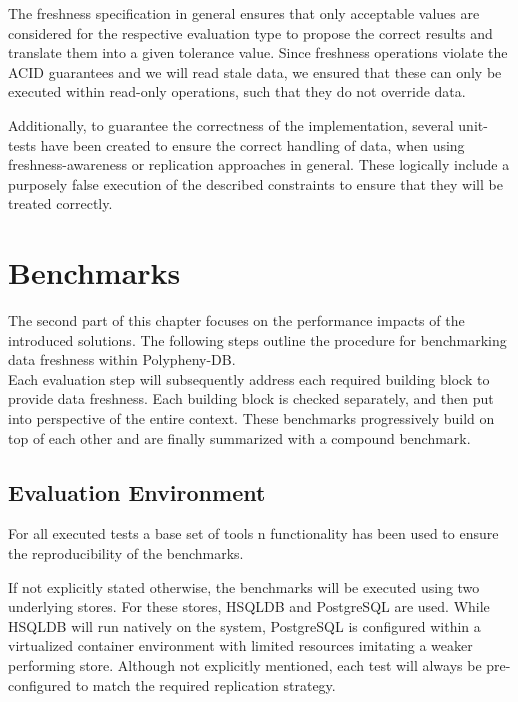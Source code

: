 The freshness specification in general ensures that only acceptable values are considered for the respective evaluation type to propose the correct results and translate them into
a given tolerance value.
Since freshness operations violate the ACID guarantees and we will read stale data, we ensured that these can only be executed within read-only operations, 
such that they do not override data.


Additionally, to guarantee the correctness of the implementation, several unit-tests have 
been created to ensure the correct handling of data, when using freshness-awareness or replication approaches in general.
These logically include a purposely false execution of the described constraints to ensure that they will be treated correctly.




\section{Benchmarks}

The second part of this chapter focuses on the performance impacts of the introduced solutions.
The following steps outline the procedure for benchmarking data freshness within Polypheny-DB.\\
Each evaluation step will subsequently address each required building block to provide data freshness.
Each building block is checked separately, and then put into perspective of the entire context.
These benchmarks progressively build on top of each other and are finally summarized with a compound benchmark.\\




\subsection{Evaluation Environment}
\label{sec:env}

For all executed tests a base set of tools n functionality has been used to ensure the reproducibility of the benchmarks.

If not explicitly stated otherwise, the benchmarks will be executed using two underlying stores.
For these stores, HSQLDB and PostgreSQL are used. While HSQLDB will run natively on the system, PostgreSQL is configured within a virtualized
container environment with limited resources imitating a weaker performing store.
Although not explicitly mentioned, each test will always be pre-configured to match the required replication strategy.






